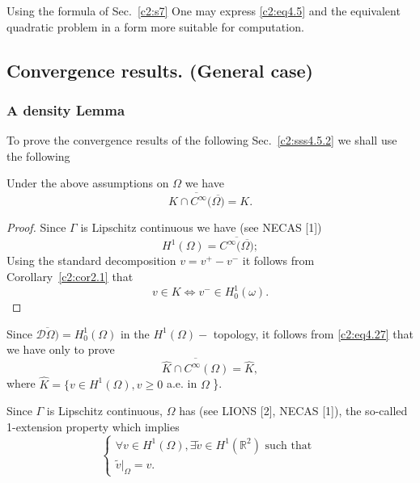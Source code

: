 \begin{remark}\label{c2:rem4.7}%
 Using the formula of Sec.~\ref{c2:s7} One may express
 \eqref{c2:eq4.5} and the equivalent 
 quadratic problem in a form more suitable for computation.  
\end{remark}

\subsection{Convergence results. (General case)}\label{c2:ss4.5} 

\subsubsection{A density Lemma}\label{c2:sss4.5.1}
 To prove the convergence results of the following
 Sec.~\ref{c2:sss4.5.2} we shall use the following   

\begin{lemma}\label{c2:lem4.2}%
Under the above assumptions on $\Omega$ we have 
$$
\overline{K \cap C^\infty (\overline{\Omega)}} = K.
$$
\end{lemma}

\begin{proof}
Since $\Gamma$ is Lipschitz continuous we have (see NECAS [1]) 
$$
H^1(\Omega) = \overline{C^\infty (\overline{\Omega)}}; 
$$
Using the standard decomposition $v = v^+ -v^-$ it follows from
Corollary~\ref{c2:cor2.1} that  
\begin{equation}
v \in  K \iff v^{-} \in H^1_0
(\omega). \tag{4.27}\label{c2:eq4.27} 
\end{equation}
\end{proof}

Since $\overline{\mathscr{D}{\Omega)}} = H^1_0 (\Omega)$ in the
$H^1(\Omega)-$ topology, it follows from \eqref{c2:eq4.27} that we
have only to prove  
\begin{equation}
\overline{\hat{K}\cap C^\infty (\Omega)} = \hat{K},
\end{equation}
where $\hat{K} = \{v \in H^1 (\Omega) , v \geq 0 $ a.e. in
$\Omega$ \}. 

Since $\Gamma$ is Lipschitz continuous, $\Omega$ has (see LIONS [2],
NECAS [1]), the so-called 1-extension property which implies  
\begin{equation}
\begin{cases}
\forall v \in H^1 (\Omega) , \exists \tilde{v} \in H^1
(\mathbb{R}^2) \text{ such that }\\ 
\tilde{v}|_\Omega = v.  \tag{4.29}\label{c2:eq4.29}
\end{cases}
\end{equation}

